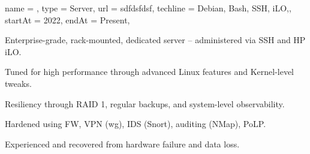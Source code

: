 \begin{projectx}{%
    name = {\laniakea},
    type = {Server},
    url = sdfdsfdsf,
    techline = {Debian,
    Bash, SSH, iLO,},
    startAt = 2022,
    endAt = Present,
  }
\item Enterprise-grade, rack-mounted, dedicated server --
  administered via SSH and HP iLO.
\item Tuned for high performance through advanced Linux features
  and Kernel-level tweaks.
\item Resiliency through RAID 1, regular backups, and system-level
  observability.
\item Hardened using FW, VPN (wg), IDS (Snort), auditing (NMap), PoLP.
\item Experienced and recovered from hardware failure and data loss.
\end{projectx}
